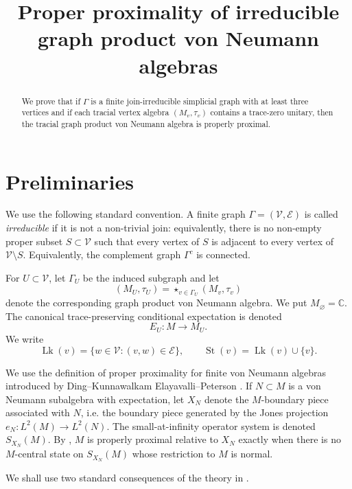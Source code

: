\documentclass[11pt]{amsart}
\theoremstyle{definition}
\newcommand{\V}{\mathcal V}
\newcommand{\E}{\mathcal E}
\newcommand{\Lk}{\operatorname{Lk}}
\newcommand{\St}{\operatorname{St}}
\newcommand{\C}{\mathbb C}
\begin{document}
\title[Proper proximality of irreducible graph products]{Proper proximality of irreducible graph product von Neumann algebras}
\author{}
\date{}

\maketitle

\begin{abstract}
We prove that if $\Gamma$ is a finite join-irreducible simplicial graph with at least three vertices and if each tracial vertex algebra $(M_v,\tau_v)$ contains a trace-zero unitary, then the tracial graph product von Neumann algebra is properly proximal.
\end{abstract}

\section{Preliminaries}

We use the following standard convention.  A finite graph $\Gamma=(\V,\E)$ is called \emph{irreducible} if it is not a non-trivial join: equivalently, there is no non-empty proper subset $S\subset \V$ such that every vertex of $S$ is adjacent to every vertex of $\V\setminus S$.  Equivalently, the complement graph $\Gamma^c$ is connected.

For $U\subset \V$, let $\Gamma_U$ be the induced subgraph and let
\[
(M_U,\tau_U)=\mathop{\star}_{v\in \Gamma_U}(M_v,\tau_v)
\]
denote the corresponding graph product von Neumann algebra.  We put $M_\varnothing=\C$.  The canonical trace-preserving conditional expectation is denoted
\[
E_U:M\to M_U.
\]
We write
\[
\Lk(v)=\{w\in \V: (v,w)\in \E\},
\qquad
\St(v)=\Lk(v)\cup\{v\}.
\]

We use the definition of proper proximality for finite von Neumann algebras introduced by Ding--Kunnawalkam Elayavalli--Peterson \cite{DKEP}.  If $N\subset M$ is a von Neumann subalgebra with expectation, let $X_N$ denote the $M$-boundary piece associated with $N$, i.e. the boundary piece generated by the Jones projection $e_N:L^2(M)\to L^2(N)$.  The small-at-infinity operator system is denoted $S_{X_N}(M)$.  By \cite[Theorems 6.2 and 8.5]{DKEP}, $M$ is properly proximal relative to $X_N$ exactly when there is no $M$-central state on $S_{X_N}(M)$ whose restriction to $M$ is normal.

We shall use two standard consequences of the theory in \cite{DKEP}.
\end{document}
